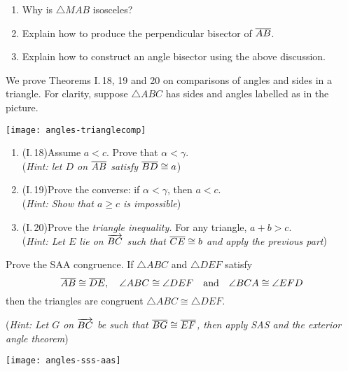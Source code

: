 \begin{exercises}
\begin{enumerate}
\begin{enumerate}
	  \item Why is $\triangle MAB$ isosceles?
	  
	  \item Explain how to produce the perpendicular bisector of $\overline{AB}$.
	  
	  \item Explain how to construct an angle bisector using the above discussion.
	\end{enumerate}
  
 
  
  \begin{minipage}[t]{0.57\linewidth}\vspace{0pt}
  \item\label{ex:euclidi19} We prove Theorems I.\,18, 19 and 20 on comparisons of angles and sides in a triangle. For clarity, suppose $\triangle ABC$ has sides and angles labelled as in the picture.
  \end{minipage}\begin{minipage}[t]{0.42\linewidth}\vspace{0pt}
  \flushright\texttt{[image: angles-trianglecomp]}
  \end{minipage}
  \vspace{-55pt}
   \begin{enumerate}
     \item (I.\,18)\quad Assume $a<c$. Prove that $\alpha<\gamma$.\\
     (\emph{Hint: let $D$ on $\overline{AB}$ satisfy $\overline{BD}\cong a$})
     \item (I.\,19)\quad Prove the converse: if $\alpha<\gamma$, then $a<c$.\\
     (\emph{Hint: Show that $a\ge c$ is impossible})
     \item (I.\,20)\quad Prove the \emph{triangle inequality.} For any triangle, $a+b>c$.\\
     (\emph{Hint: Let $E$ lie on $\overrightarrow{BC}$ such that $\overline{CE}\cong b$ and apply the previous part})
   \end{enumerate}
   
   \goodbreak
  
  \begin{minipage}[t]{0.62\linewidth}\vspace{0pt}
  \item Prove the SAA congruence. If $\triangle ABC$ and $\triangle DEF$ satisfy
  \[\overline{AB}\cong\overline{DE},\quad \angle ABC\cong\angle{DEF}\quad \text{and}\quad\angle BCA\cong\angle EFD\]
  then the triangles are congruent $\triangle ABC\cong\triangle DEF$.\par
  (\emph{Hint: Let $G$ on $\overrightarrow{BC}$ be such that $\overline{BG}\cong\overline{EF}$, then apply SAS and the exterior angle theorem})
  \end{minipage}\begin{minipage}[t]{0.38\linewidth}\vspace{0pt}
	\flushright\texttt{[image: angles-sss-aas]}
	\end{minipage}
  

\end{enumerate}
\end{exercises}
